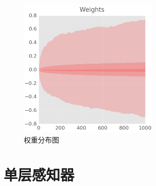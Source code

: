 \begin{content}
\begin{figure}[H]
\centering
\includegraphics[width=0.6\textwidth]{figures/mnist-weight-fig.png}
\caption{权重分布图}
 \label{fig:mnist-weight-fig}
\end{figure}

\end{content}

\section{单层感知器}

